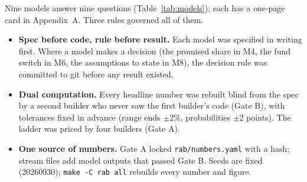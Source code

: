 \documentclass[11pt,a4paper]{article}
\begin{document}
Nine models answer nine questions (Table~\ref{tab:models}); each has a one-page card in Appendix~A. Three rules
governed all of them.
\begin{itemize}
  \item \textbf{Spec before code, rule before result.} Each model was specified in writing first. Where a model makes a
  decision (the promised share in M4, the fund switch in M6, the assumptions to state in M8), the decision rule was
  committed to git before any result existed.
  \item \textbf{Dual computation.} Every headline number was rebuilt blind from the spec by a second builder who never
  saw the first builder's code (Gate B), with tolerances fixed in advance (range ends $\pm$2\%, probabilities
  $\pm$2 points). The ladder was priced by four builders (Gate A).
  \item \textbf{One source of numbers.} Gate A locked \texttt{rab/numbers.yaml} with a hash; stream files add model
  outputs that passed Gate B. Seeds are fixed (20260930); \texttt{make -C rab all} rebuilds every number and figure.
\end{itemize}
\end{document}
